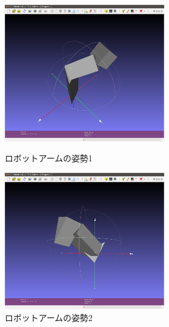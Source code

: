 \documentclass[a4paper,10pt]{jsarticle}
\begin{document}
\begin{figure}[b]
 \begin{minipage}{0.5\hsize}
  \begin{center}
   \includegraphics[width=70mm, bb = 0 0 1333 1142]{fig/png/arm1.png}
  \end{center}
  \caption{ロボットアームの姿勢1}
  \label{fig:ロボットアームの姿勢1}
 \end{minipage}
 \begin{minipage}{0.5\hsize}
  \begin{center}
   \includegraphics[width=70mm, bb = 0 0 1333 1142]{fig/png/arm2.png}
  \end{center}
  \caption{ロボットアームの姿勢2}
  \label{fig:ロボットアームの姿勢2}
 \end{minipage}
\end{figure}
\end{document}
